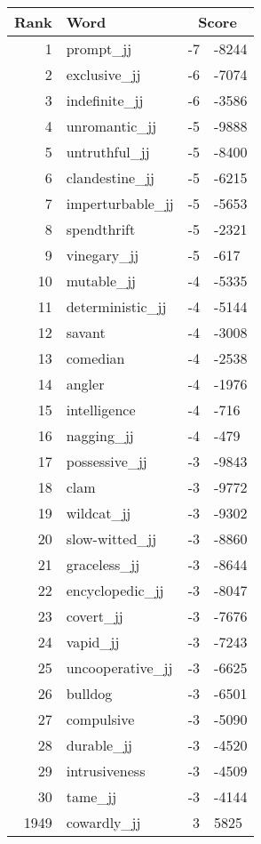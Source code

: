 \begin{longtable}[!htbp]{| rlr@{.}l |}
    \hline
    \textbf{Rank} & \textbf{Word} & \multicolumn{2}{c|}{\textbf{Score}} \\
    \hline
    \endhead
    1 & prompt\_jj & -7 & -8244 \\
    2 & exclusive\_jj & -6 & -7074 \\
    3 & indefinite\_jj & -6 & -3586 \\
    4 & unromantic\_jj & -5 & -9888 \\
    5 & untruthful\_jj & -5 & -8400 \\
    6 & clandestine\_jj & -5 & -6215 \\
    7 & imperturbable\_jj & -5 & -5653 \\
    8 & spendthrift & -5 & -2321 \\
    9 & vinegary\_jj & -5 & -617 \\
    10 & mutable\_jj & -4 & -5335 \\
    11 & deterministic\_jj & -4 & -5144 \\
    12 & savant & -4 & -3008 \\
    13 & comedian & -4 & -2538 \\
    14 & angler & -4 & -1976 \\
    15 & intelligence & -4 & -716 \\
    16 & nagging\_jj & -4 & -479 \\
    17 & possessive\_jj & -3 & -9843 \\
    18 & clam & -3 & -9772 \\
    19 & wildcat\_jj & -3 & -9302 \\
    20 & slow-witted\_jj & -3 & -8860 \\
    21 & graceless\_jj & -3 & -8644 \\
    22 & encyclopedic\_jj & -3 & -8047 \\
    23 & covert\_jj & -3 & -7676 \\
    24 & vapid\_jj & -3 & -7243 \\
    25 & uncooperative\_jj & -3 & -6625 \\
    26 & bulldog & -3 & -6501 \\
    27 & compulsive & -3 & -5090 \\
    28 & durable\_jj & -3 & -4520 \\
    29 & intrusiveness & -3 & -4509 \\
    30 & tame\_jj & -3 & -4144 \\
    1949 & cowardly\_jj & 3 & 5825 \\

\end{longtable}
